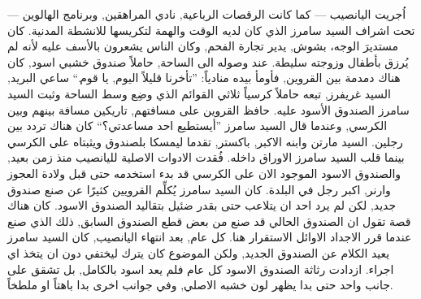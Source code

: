 \documentclass[12pt, a4paper]{article}
\begin{document}
\begin{otherlanguage}{arabic}
\newpage
اُجريت اليانصيب — كما كانت الرقصات الرباعية, نادي المراهقين, وبرنامج الهالوين — تحت اشراف السيد سامرز
الذي كان لديه الوقت والهمة لتكريسها للانشطة المدنية. كان مستديرَ الوجه، بشوش,  يدير تجارة 
الفحم, وكان الناس يشعرون بالأسف عليه لأنه لم يُرزق بأطفال وزوجته سليطة. عند وصوله الى الساحة, حاملاً صندوق
خشبي اسود, كان هناك دمدمة بين القروين, فأومأ بيده منادياً: ”تأخرنا قليلاً اليوم, يا قوم.“ ساعي البريد, 
السيد غريفرز, تبعه حاملاً  كرسياً ثلاثي القوائم الذي وضِع  وسط الساحة وثبت  السيد سامرز الصندوق الأسود عليه.
حافظ القروين على مسافتهم, تاريكين مسافة بينهم وبين الكرسي, وعندما قال السيد سامرز ”أيستطيع احد مساعدتي؟“
كان هناك تردد بين رجلين. السيد مارتن وابنه الاكبر, باكستر, تقدما ليمسكا بلصندوق ويثبتاه على الكرسي بينما
قلب السيد سامرز الاوراق داخله. فُقدت الادوات الاصلية لليانصيب منذ زمن بعيد, والصندوق الاسود الموجود الان
على الكرسي قد بدء استخدمه حتى قبل ولادة العجوز وارنر, اكبر رجل في البلدة. كان السيد سامرز يُكلِّم القرويين 
كثيرًا عن صنع صندوق جديد, لكن لم يرد احد ان يتلاعب حتى بقدر ضئيل بتقاليد الصندوق الاسود. كان هناك قصة تقول
ان الصندوق الحالي قد صنع من بعض قطع الصندوق السابق, ذلك الذي صنع عندما قرر الاجداد الاوائل الاستقرار هنا.
كل عام, بعد انتهاء اليانصيب, كان السيد سامرز يعيد الكلام عن الصندوق الجديد, ولكن الموضوع كان يترك ليختفي
دون ان يتخذ اي اجراء. ازدادت رثاثة الصندوق الاسود كل عام فلم يعد اسود بالكامل, بل تشقق على جانب واحد حتى
بدا يظهر لون خشبه الاصلي, وفي جوانب اخرى بدا باهتاً او ملطخاً.


\end{otherlanguage}
\end{document}

